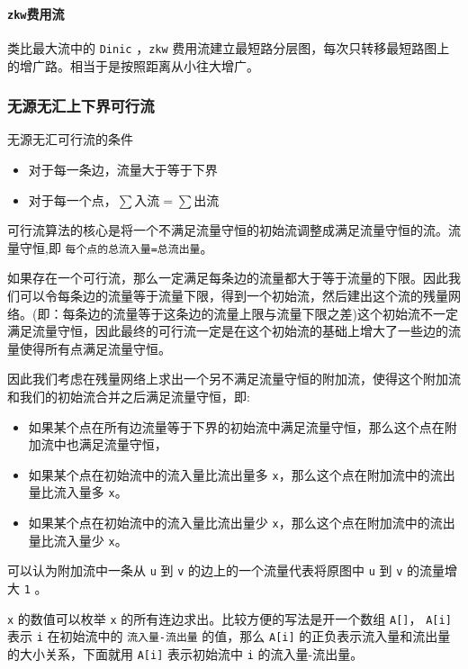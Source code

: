 \documentclass[UTF-8]{ctexart}
\begin{document}
	\paragraph{\texttt{zkw}费用流} 类比最大流中的 \texttt{Dinic} ，\texttt{zkw} 费用流建立最短路分层图，每次只转移最短路图上的增广路。相当于是按照距离从小往大增广。
	\subsubsection{无源无汇上下界可行流}
	无源无汇可行流的条件 
	\begin{itemize}
		\item 对于每一条边，流量大于等于下界  
		\item 对于每一个点，$\sum \mbox{入流}=\sum \mbox{出流}$
	\end{itemize} 
	
	可行流算法的核心是将一个不满足流量守恒的初始流调整成满足流量守恒的流。流量守恒,即 \texttt{每个点的总流入量=总流出量}。  
	
	如果存在一个可行流，那么一定满足每条边的流量都大于等于流量的下限。因此我们可以令每条边的流量等于流量下限，得到一个初始流，然后建出这个流的残量网络。(即：每条边的流量等于这条边的流量上限与流量下限之差)这个初始流不一定满足流量守恒，因此最终的可行流一定是在这个初始流的基础上增大了一些边的流量使得所有点满足流量守恒。  
	
	因此我们考虑在残量网络上求出一个另不满足流量守恒的附加流，使得这个附加流和我们的初始流合并之后满足流量守恒，即:  
	
	\begin{itemize}
		\item 如果某个点在所有边流量等于下界的初始流中满足流量守恒，那么这个点在附加流中也满足流量守恒，
		\item 如果某个点在初始流中的流入量比流出量多 \texttt{x}，那么这个点在附加流中的流出量比流入量多 \texttt{x}。  
		\item 如果某个点在初始流中的流入量比流出量少 \texttt{x}，那么这个点在附加流中的流出量比流入量少 \texttt{x}。
	\end{itemize}
	
	可以认为附加流中一条从  \texttt{u} 到 \texttt{v} 的边上的一个流量代表将原图中 \texttt{u} 到 \texttt{v} 的流量增大 \texttt{1} 。  
	
	 \texttt{x} 的数值可以枚举 \texttt{x} 的所有连边求出。比较方便的写法是开一个数组  \texttt{A[]}， \texttt{A[i]} 表示 \texttt{i} 在初始流中的 \texttt{流入量-流出量} 的值，那么 \texttt{A[i]} 的正负表示流入量和流出量的大小关系，下面就用 \texttt{A[i]} 表示初始流中 \texttt{i} 的流入量-流出量。  
	
\end{document}
